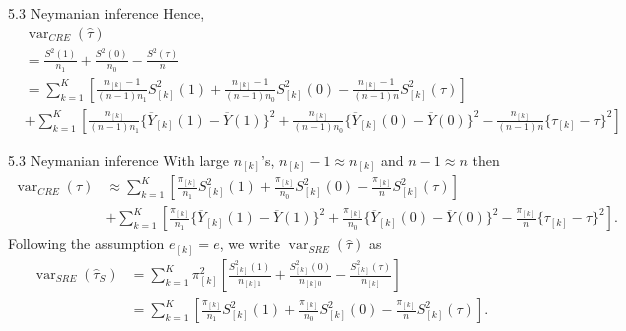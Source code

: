 \documentclass[aspectratio=169, 12pt]{beamer}
\begin{document}
\begin{frame}{5.3 Neymanian inference}
  Hence,
  {\small
  \begin{align*}
    &\operatorname{var}_{CRE}(\widehat{\tau})\\
    &= \frac{S^2(1)}{n_1} + \frac{S^2(0)}{n_0} - \frac{S^2(\tau)}{n}\\
    &= \sum_{k=1}^{K}\left[
      \frac{n_{[k]}-1}{(n-1)n_1}S_{[k]}^2(1) + \frac{n_{[k]}-1}{(n-1)n_0}S_{[k]}^2(0) - \frac{n_{[k]}-1}{(n-1)n}S_{[k]}^2(\tau)
    \right]\\
    &+ \sum_{k=1}^{K}\left[
      \frac{n_{[k]}}{(n-1)n_1}\{\overline{Y}_{[k]}(1)-\overline{Y}(1)\}^2 + \frac{n_{[k]}}{(n-1)n_0}\{\overline{Y}_{[k]}(0)-\overline{Y}(0)\}^2 - \frac{n_{[k]}}{(n-1)n}\{\tau_{[k]}-\tau\}^2
    \right]
  \end{align*}}
\end{frame}

\begin{frame}{5.3 Neymanian inference}
  With large $n_{[k]}$'s, $n_{[k]}-1\approx n_{[k]}$ and $n-1\approx n$ then
  {\footnotesize
    \begin{align*}
  \operatorname{var}_{CRE}(\widehat{\tau}) 
  &\approx \sum_{k=1}^{K}\left[\frac{\pi_{[k]}}{n_1}S_{[k]}^2(1)+\frac{\pi_{[k]}}{n_0}S^2_{[k]}(0)-\frac{\pi_{[k]}}{n}S_{[k]}^2(\tau)\right]\\
  &+ \sum_{k=1}^{K}\left[\frac{\pi_{[k]}}{n_1}\{\overline{Y}_{[k]}(1)-\overline{Y}(1)\}^2+\frac{\pi_{[k]}}{n_0}\{\overline{Y}_{[k]}(0)-\overline{Y}(0)\}^2- \frac{\pi_{[k]}}{n}\{\tau_{[k]}-\tau\}^2\right].
  \end{align*}}
  Following the assumption $e_{[k]}=e$, we write $\operatorname{var}_{SRE}(\widehat{\tau})$ as
  {\footnotesize
    \begin{align*}
    \operatorname{var}_{SRE}(\widehat{\tau}_S)
    &= \sum_{k=1}^{K}\pi_{[k]}^2\left[
      \frac{S_{[k]}^2(1)}{n_{[k]1}} + \frac{S_{[k]}^2(0)}{n_{[k]0}} - \frac{S_{[k]}^2(\tau)}{n_{[k]}}
    \right]\\
    &= \sum_{k=1}^{K}\left[
      \frac{\pi_{[k]}}{n_1}S_{[k]}^2(1) + \frac{\pi_{[k]}}{n_0}S_{[k]}^2(0) - \frac{\pi_{[k]}}{n}S_{[k]}^2(\tau)
    \right].
  \end{align*}}
\end{frame}
\end{document}
